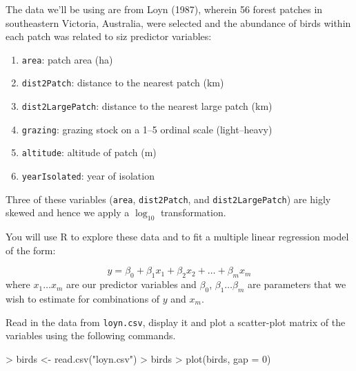 \documentclass[letterpaper,10pt]{article}
\newcommand{\R}{\textsf{R}\xspace}
\begin{document}
The data we'll be using are from Loyn (1987), wherein 56 forest patches in southeastern Victoria, Australia, were selected and the abundance of birds within each patch was related to siz predictor variables:

\begin{enumerate}
\item \texttt{area}: patch area (ha)
\item \texttt{dist2Patch}: distance to the nearest patch (km)
\item \texttt{dist2LargePatch}: distance to the nearest large patch (km)
\item \texttt{grazing}: grazing stock on a 1--5 ordinal scale (light--heavy)
\item \texttt{altitude}: altitude of patch (m)
\item \texttt{yearIsolated}: year of isolation
\end{enumerate}

Three of these variables (\texttt{area}, \texttt{dist2Patch}, and \texttt{dist2LargePatch}) are higly skewed and hence we apply a $\log_{10}$ transformation.

You will use \R to explore these data and to fit a multiple linear regression model of the form:

\begin{displaymath}
    y = \beta_0 + \beta_1x_1 + \beta_2x_2 + \ldots + \beta_mx_m
\end{displaymath}
where $x_1 \ldots x_m$ are our predictor variables and $\beta_0$, $\beta_1 \ldots \beta_m$ are parameters that we wish to estimate for combinations of $y$ and $x_m$.

Read in the data from \texttt{loyn.csv}, display it and plot a scatter-plot matrix of the variables using the following commands.


\begin{Schunk}
\begin{Sinput}
> birds <- read.csv("loyn.csv")
> birds
> plot(birds, gap = 0)
\end{Sinput}
\end{Schunk}
\end{document}
